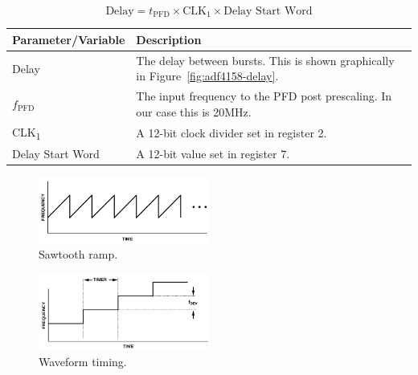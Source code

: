 \begin{equation}
        \label{eq:adf4158-delay}
        \text{Delay} = t_{\text{PFD}} \times \text{CLK}_1 \times \text{Delay Start Word}
\end{equation}

\label{tab:adf4158-delay-equation-vars}
\begin{tabularx}{\textwidth}{l X>{\raggedright\arraybackslash}X}
        \toprule
        \textbf{Parameter/Variable} & \textbf{Description} \\
        \midrule

        \endhead

        Delay & The delay between bursts. This is shown graphically in Figure~\ref{fig:adf4158-delay}. \\
        $f_{\text{PFD}}$ & The input frequency to the PFD post prescaling. In our case this is 20MHz. \\
        CLK\textsubscript{1} & A 12-bit clock divider set in register 2. \\
        Delay Start Word & A 12-bit value set in register 7. \\

        \bottomrule
\end{tabularx}

\begin{figure}[h]
        \centering
        \includegraphics[width=0.5\textwidth]{data/adf4158-sawtooth-ramp.png}
        \caption{Sawtooth ramp.}
        \label{fig:adf4158-sawtooth-ramp}\end{figure}

\begin{figure}[h]
        \centering
        \includegraphics[width=0.5\textwidth]{data/adf4158-waveform-timing.png}
        \caption{Waveform timing.}
        \label{fig:adf4158-waveform-timing}
\end{figure}

